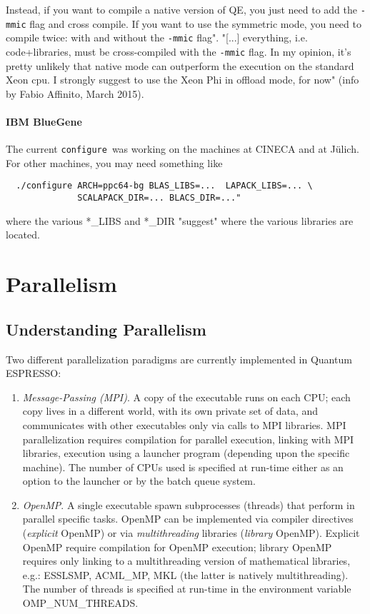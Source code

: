 \documentclass[12pt,a4paper]{article}
\def\qe{{\sc Quantum ESPRESSO}}
\def\configure{\texttt{configure}}
\begin{document}
Instead, if you want to compile a native version of QE, you just need
to add the \texttt{-mmic} flag and cross compile. If you want to use
the symmetric mode, you need to compile twice: with and without the
\texttt{-mmic} flag". "[...] everything, i.e. code+libraries, must be
cross-compiled with the \texttt{-mmic} flag. In my opinion, it's pretty
unlikely that native mode can outperform the execution on the standard
Xeon cpu. I strongly suggest to use the Xeon Phi in offload mode, for now"
(info by Fabio Affinito, March 2015).

\paragraph{IBM BlueGene}

The current \configure\ was working on the machines at CINECA and at J\"ulich.
For other machines, you may need something like
\begin{verbatim}
  ./configure ARCH=ppc64-bg BLAS_LIBS=...  LAPACK_LIBS=... \
              SCALAPACK_DIR=... BLACS_DIR=..."
\end{verbatim}
where the various *\_LIBS and *\_DIR "suggest" where the various libraries
are located.

\newpage

\section{Parallelism}
\label{Sec:para}

\subsection{Understanding Parallelism}

Two different parallelization paradigms are currently implemented
in \qe:
\begin{enumerate}
\item {\em Message-Passing (MPI)}. A copy of the executable runs
on each CPU; each copy lives in a different world, with its own
private set of data, and communicates with other executables only
via calls to MPI libraries. MPI parallelization requires compilation
for parallel execution, linking with MPI libraries, execution using
a launcher program (depending upon the specific machine). The number of CPUs used
is specified at run-time either as an option to the launcher or
by the batch queue system.
\item {\em OpenMP}.  A single executable spawn subprocesses
(threads) that perform in parallel specific tasks.
OpenMP can be implemented via compiler directives ({\em explicit}
OpenMP) or via {\em multithreading} libraries  ({\em library} OpenMP).
Explicit OpenMP require compilation for OpenMP execution;
library OpenMP requires only linking to a multithreading
version of mathematical libraries, e.g.:
ESSLSMP, ACML\_MP, MKL (the latter is natively multithreading).
The number of threads is specified at run-time in the environment
variable OMP\_NUM\_THREADS.
\end{enumerate}
\end{document}
